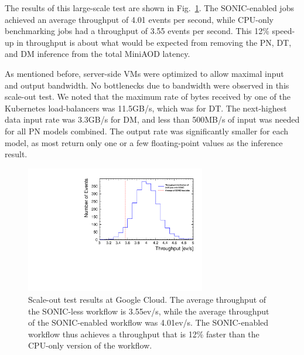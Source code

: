 The results of this large-scale test are shown in Fig.~\ref{fig:scaleout}. The SONIC-enabled jobs achieved an average throughput of 4.01 events per second, while CPU-only benchmarking jobs had a throughput of 3.55 events per second. This 12\% speed-up in throughput is about what would be expected from removing the PN, DT, and DM inference from the total MiniAOD latency.

As mentioned before, server-side VMs were optimized to allow maximal input and output bandwidth. No bottlenecks due to bandwidth were observed in this scale-out test. We noted that the maximum rate of bytes received by one of the Kubernetes load-balancers was 11.5\unit{GB/s}, which was for DT. The next-highest data input rate was 3.3\unit{GB/s} for DM, and less than 500\unit{MB/s} of input was needed for all PN models combined. The output rate was significantly smaller for each model, as most return only one or a few floating-point values as the inference result.



\begin{figure}[htp]
    \centering
    \includegraphics[width=0.70\textwidth]{plots/scale_out_test_reformat.pdf}
    \caption{Scale-out test results at Google Cloud. The average throughput of the SONIC-less workflow is 3.55\unit{ev/s}, while the average throughput of the SONIC-enabled workflow was 4.01\unit{ev/s}. The SONIC-enabled workflow thus achieves a throughput that is 12\% faster than the CPU-only version of the workflow.}
    \label{fig:scaleout}
\end{figure}

